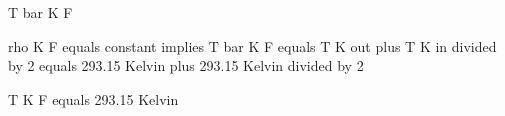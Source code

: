 T bar K F

rho K F equals constant implies T bar K F equals T K out plus T K in divided by 2 equals 293.15 Kelvin plus 293.15 Kelvin divided by 2

T K F equals 293.15 Kelvin